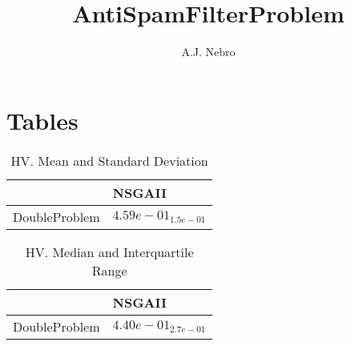 \documentclass{article}
\title{AntiSpamFilterProblem}
\author{A.J. Nebro}
\begin{document}
\maketitle
\section{Tables}

\begin{table}
\caption{HV. Mean and Standard Deviation}
\label{table: HV}
\centering
\begin{scriptsize}
\begin{tabular}{ll}
\hline &  NSGAII\\
\hline 
DoubleProblem & \cellcolor{gray95}$  4.59e-01_{ 1.5e-01}$ \\
\hline
\end{tabular}
\end{scriptsize}
\end{table}

\begin{table}
\caption{HV. Median and Interquartile Range}
\label{table: HV}
\centering
\begin{scriptsize}
\begin{tabular}{ll}
\hline &  NSGAII\\
\hline 
DoubleProblem & \cellcolor{gray95}$  4.40e-01_{ 2.7e-01}$ \\
\hline
\end{tabular}
\end{scriptsize}
\end{table}
\end{document}
